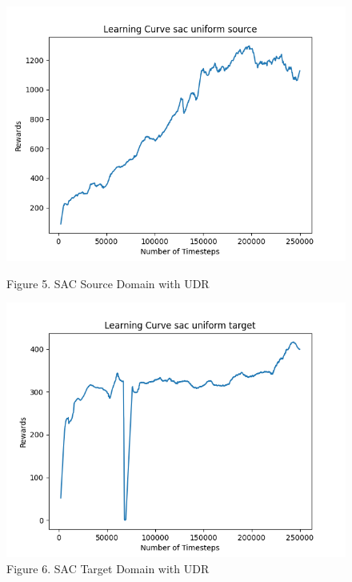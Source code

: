 \documentclass[12pt]{article}
\begin{document}
\begin{figure}[H]
    \centering
    \begin{minipage}{0.45\textwidth}
        \centering
        \includegraphics[width=\textwidth]{../images/Learning_Curve_SAC_Uniform_Source.png}
        \caption{Figure 5. SAC Source Domain with UDR}
        \label{fig:sac_source_udr}
    \end{minipage}
    \hfill
    \begin{minipage}{0.45\textwidth}
        \centering
        \includegraphics[width=\textwidth]{../images/Learning_Curve_SAC_Uniform_Target.png}
        \caption{Figure 6. SAC Target Domain with UDR}
        \label{fig:sac_target_udr}
    \end{minipage}

\end{figure}
\end{document}
